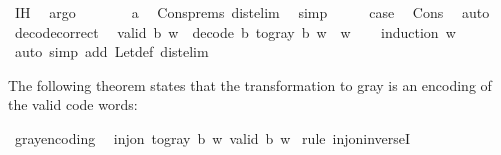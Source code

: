 \begin{isabellebody}
\ IH\ \isamarkupfalse%
\ argo\isanewline
\ \ \isamarkupfalse%
\ \isamarkupfalse%
\ {\isachardoublequoteopen}{\isachardot}{\kern0pt}{\isachardot}{\kern0pt}{\isachardot}{\kern0pt}\ {\isacharequal}{\kern0pt}\ a{\isachardoublequoteclose}\ \isamarkupfalse%
\ Cons{\isachardot}{\kern0pt}prems\ dist{}{\isacharunderscore}{\kern0pt}elim{\isacharunderscore}{\kern0pt}{}\ \isamarkupfalse%
\ simp\isanewline
\ \ \isamarkupfalse%
\ \isamarkupfalse%
\ {\isacharquery}{\kern0pt}case\ \isamarkupfalse%
\ Cons\ \isamarkupfalse%
\ auto\isanewline
{}\isamarkupfalse%
%
\endisatagproof
{\isafoldproof}%
%
\isadelimproof
\isanewline
%
\endisadelimproof
\isanewline
{}\isamarkupfalse%
\ decode{\isacharunderscore}{\kern0pt}correct{\isacharcolon}{\kern0pt}\isanewline
\ \ {\isachardoublequoteopen}valid\ b\ w\ {\isasymLongrightarrow}\ decode\ b\ {\isacharparenleft}{\kern0pt}to{\isacharunderscore}{\kern0pt}gray\ b\ w{\isacharparenright}{\kern0pt}\ {\isacharequal}{\kern0pt}\ w{\isachardoublequoteclose}\isanewline
%
\isadelimproof
\ \ %
\endisadelimproof
%
\isatagproof
{}\isamarkupfalse%
\ {\isacharparenleft}{\kern0pt}induction\ w{\isacharparenright}{\kern0pt}\isanewline
\ \ \isamarkupfalse%
\ {\isacharparenleft}{\kern0pt}auto\ simp\ add{\isacharcolon}{\kern0pt}\ Let{\isacharunderscore}{\kern0pt}def\ dist{}{\isacharunderscore}{\kern0pt}elim{\isacharunderscore}{\kern0pt}{}{\isacharparenright}{\kern0pt}%
\endisatagproof
{\isafoldproof}%
%
\isadelimproof
%
\endisadelimproof
%
\begin{isamarkuptext}%
The following theorem states that the transformation to gray
  is an encoding of the valid code words:%
\end{isamarkuptext}\isamarkuptrue%
\isamarkupfalse%
\ gray{\isacharunderscore}{\kern0pt}encoding{\isacharcolon}{\kern0pt}\isanewline
\ \ {\isachardoublequoteopen}inj{\isacharunderscore}{\kern0pt}on\ {\isacharparenleft}{\kern0pt}to{\isacharunderscore}{\kern0pt}gray\ b{\isacharparenright}{\kern0pt}\ {\isacharbraceleft}{\kern0pt}w{\isachardot}{\kern0pt}\ valid\ b\ w{\isacharbraceright}{\kern0pt}{\isachardoublequoteclose}\isanewline
%
\isadelimproof
%
\endisadelimproof
%
\isatagproof
{}\isamarkupfalse%
\ {\isacharparenleft}{\kern0pt}rule\ inj{\isacharunderscore}{\kern0pt}on{\isacharunderscore}{\kern0pt}inverseI{\isacharparenright}{\kern0pt}\isanewline

\end{isabellebody}
